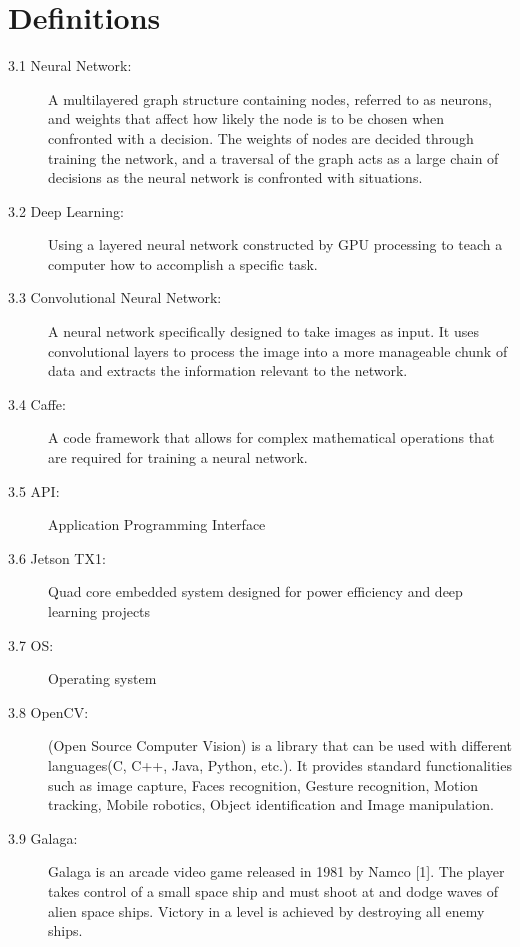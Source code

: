 \documentclass{scrreprt}
\begin{document}
\chapter{Definitions}
\begin{description}

  \item[3.1 Neural Network:] A multilayered graph structure containing nodes, referred to as neurons, and weights that affect how likely the node is to be chosen when confronted with a decision.
The weights of nodes are decided through training the network, and a traversal of the graph acts as a large chain of decisions as the neural network is confronted with situations.

  \item[3.2 Deep Learning:]  Using a layered neural network constructed by GPU processing to teach a computer how to accomplish a specific task.

  \item[3.3 Convolutional Neural Network:] A neural network specifically designed to take images as input.
It uses convolutional layers to process the image into a more manageable chunk of data and extracts the information relevant to the network.

  \item[3.4 Caffe:] A code framework that allows for complex mathematical operations that are required for training a neural network.

  \item[3.5 API:] Application Programming Interface

  \item[3.6 Jetson TX1:] Quad core embedded system designed for power efficiency and deep learning projects

  \item[3.7 OS:] Operating system

  \item[3.8 OpenCV:] (Open Source Computer Vision) is a library that can be used with different languages(C, C++, Java, Python, etc.). It provides standard functionalities such as image capture, Faces recognition, Gesture recognition, Motion tracking, Mobile robotics, Object identification and Image manipulation.

  \item[3.9 Galaga:] Galaga is an arcade video game released in 1981 by Namco [1]. The player takes control of a small space ship and must shoot at and dodge waves of alien space ships.
Victory in a level is achieved by destroying all enemy ships.

\end{description}
\end{document}
